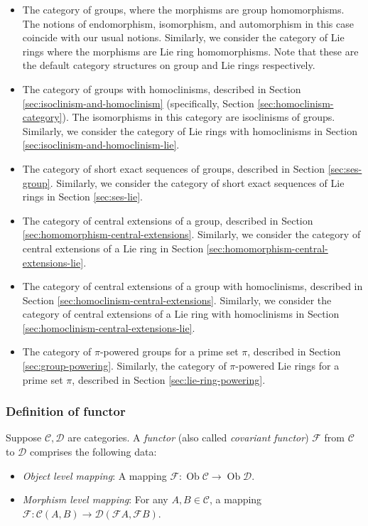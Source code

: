 \begin{itemize}
\item The category of groups, where the morphisms are group
  homomorphisms. The notions of endomorphism, isomorphism, and
  automorphism in this case coincide with our usual
  notions. Similarly, we consider the category of Lie rings where the
  morphisms are Lie ring homomorphisms. Note that these are the
  default category structures on group and Lie rings respectively.
\item The category of groups with homoclinisms, described in Section
  \ref{sec:isoclinism-and-homoclinism} (specifically, Section
  \ref{sec:homoclinism-category}). The isomorphisms in this category
  are isoclinisms of groups. Similarly, we consider the category of
  Lie rings with homoclinisms in Section
  \ref{sec:isoclinism-and-homoclinism-lie}.
\item The category of short exact sequences of groups, described in
  Section \ref{sec:ses-group}. Similarly, we consider the category of
  short exact sequences of Lie rings in Section \ref{sec:ses-lie}.
\item The category of central extensions of a group, described in
  Section \ref{sec:homomorphism-central-extensions}. Similarly, we
  consider the category of central extensions of a Lie ring in Section
  \ref{sec:homomorphism-central-extensions-lie}.
\item The category of central extensions of a group with homoclinisms,
  described in Section
  \ref{sec:homoclinism-central-extensions}. Similarly, we consider the
  category of central extensions of a Lie ring with homoclinisms in
  Section \ref{sec:homoclinism-central-extensions-lie}.
\item The category of $\pi$-powered groups for a prime set $\pi$,
  described in Section \ref{sec:group-powering}. Similarly, the
  category of $\pi$-powered Lie rings for a prime set $\pi$, described
  in Section \ref{sec:lie-ring-powering}.
\end{itemize}

\subsubsection{Definition of functor}\label{appsec:functor}

Suppose $\mathcal{C},\mathcal{D}$ are categories. A {\em functor}
(also called {\em covariant functor}) $\mathcal{F}$ from $\mathcal{C}$
to $\mathcal{D}$ comprises the following data:

\begin{itemize}
\item {\em Object level mapping}: A mapping $\mathcal{F}:
  \operatorname{Ob}\mathcal{C} \to \operatorname{Ob}\mathcal{D}$.
\item {\em Morphism level mapping}: For any $A,B \in \mathcal{C}$, a
  mapping $\mathcal{F}: \mathcal{C}(A,B) \to \mathcal{D}(\mathcal{F}A,\mathcal{F} B)$.
\end{itemize}

